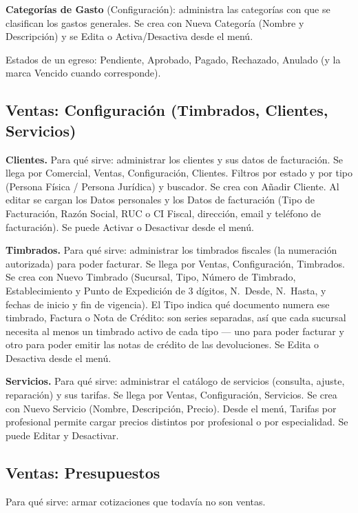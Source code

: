 \textbf{Categorías de Gasto} (Configuración): administra las categorías con que se clasifican los gastos generales. Se crea con Nueva Categoría (Nombre y Descripción) y se Edita o Activa/Desactiva desde el menú.

Estados de un egreso: Pendiente, Aprobado, Pagado, Rechazado, Anulado (y la marca Vencido cuando corresponde).

\subsection{Ventas: Configuración (Timbrados, Clientes, Servicios)}
\label{sec:mu-ventas-configuracion}

\textbf{Clientes.} Para qué sirve: administrar los clientes y sus datos de facturación. Se llega por Comercial, Ventas, Configuración, Clientes. Filtros por estado y por tipo (Persona Física / Persona Jurídica) y buscador. Se crea con Añadir Cliente. Al editar se cargan los Datos personales y los Datos de facturación (Tipo de Facturación, Razón Social, RUC o CI Fiscal, dirección, email y teléfono de facturación). Se puede Activar o Desactivar desde el menú.

\textbf{Timbrados.} Para qué sirve: administrar los timbrados fiscales (la numeración autorizada) para poder facturar. Se llega por Ventas, Configuración, Timbrados. Se crea con Nuevo Timbrado (Sucursal, Tipo, Número de Timbrado, Establecimiento y Punto de Expedición de 3 dígitos, N.\ Desde, N.\ Hasta, y fechas de inicio y fin de vigencia). El Tipo indica qué documento numera ese timbrado, Factura o Nota de Crédito: son series separadas, así que cada sucursal necesita al menos un timbrado activo de cada tipo --- uno para poder facturar y otro para poder emitir las notas de crédito de las devoluciones. Se Edita o Desactiva desde el menú.

\textbf{Servicios.} Para qué sirve: administrar el catálogo de servicios (consulta, ajuste, reparación) y sus tarifas. Se llega por Ventas, Configuración, Servicios. Se crea con Nuevo Servicio (Nombre, Descripción, Precio). Desde el menú, Tarifas por profesional permite cargar precios distintos por profesional o por especialidad. Se puede Editar y Desactivar.

\subsection{Ventas: Presupuestos}
\label{sec:mu-ventas-presupuestos}

Para qué sirve: armar cotizaciones que todavía no son ventas.

